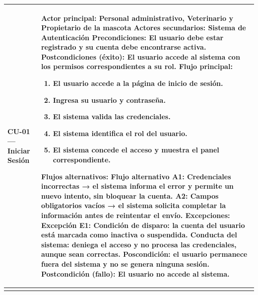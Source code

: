 \documentclass[
]{article}
\newcounter{none} %
\begin{document}
{\def\LTcaptype{none} %
\begin{longtable}[]{|
  >{\raggedright\arraybackslash}p{}|
  >{\raggedright\arraybackslash}p{}|}
\hline
\begin{minipage}[b]{\linewidth}\raggedright
\textbf{CU-01 --- Iniciar Sesión}
\end{minipage} & \begin{minipage}[b]{\linewidth}\raggedright
\textbf{Actor principal:} Personal administrativo, Veterinario y
Propietario de la mascota \textbf{Actores secundarios:} Sistema de
Autenticación
\textbf{Precondiciones:} El usuario debe estar registrado y su cuenta
debe encontrarse activa. \textbf{Postcondiciones (éxito):} El usuario accede al sistema con los
permisos correspondientes a su rol. \textbf{Flujo principal:}

\begin{enumerate}
\def\labelenumi{\arabic{enumi}.}
\item
  El usuario accede a la página de inicio de sesión.
\item
  Ingresa su usuario y contraseña.
\item
  El sistema valida las credenciales.
\item
  El sistema identifica el rol del usuario.
\item
  El sistema concede el acceso y muestra el panel correspondiente.
\end{enumerate}

\textbf{Flujos alternativos:} Flujo alternativo A1: Credenciales incorrectas → el sistema informa el error y permite un nuevo intento, sin bloquear la cuenta. A2: Campos obligatorios vacíos → el sistema solicita completar la información antes de reintentar el envío.
\textbf{Excepciones:} Excepción E1: Condición de disparo: la cuenta del usuario está marcada como inactiva o suspendida. Conducta del sistema: deniega el acceso y no procesa las credenciales, aunque sean correctas. Poscondición: el usuario permanece fuera del sistema y no se genera ninguna sesión.
\textbf{Postcondición (fallo):} El usuario no accede al sistema.
\end{minipage} \\
\hline
\endhead
\hline
\endlastfoot
\end{longtable}
}
\end{document}
